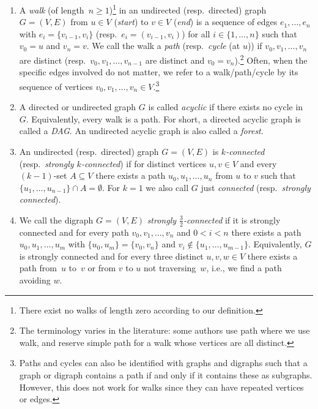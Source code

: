 \begin{enumerate}	
	\item A \emph{walk} (of length~$n \ge 1$)\footnote{There exist no walks of length zero according to our definition.}
	in an undirected (resp.~directed) graph $G = (V,E)$ from $u \in V$ (\emph{start}) to $v \in V$ (\emph{end}) is a sequence
	of edges $e_1, \ldots, e_n$
	with $e_i = \{ v_{i-1}, v_i\}$ (resp.~$e_i = (v_{i-1}, v_i)$) for all $i \in \{1,\ldots,n\}$
	such that $v_0 = u$ and $v_n = v$.
	We call the walk a \emph{path}		
	(resp.~\emph{cycle} (at $u$))
	if $v_0, v_1, \ldots, v_n$ are distinct (resp.~$v_0, v_1,\ldots, v_{n-1}$ are distinct and $v_0 = v_n$).\footnote{The 
		terminology varies in the literature: some authors use path where we use walk, and reserve simple path for a walk whose vertices are all distinct.}
	Often, when the specific edges involved do not matter, we refer to a walk/path/cycle by its sequence of vertices
	$v_0, v_1, \ldots, v_n \in V$.\footnote{Paths and cycles can also be identified
		with graphs and digraphs such that a graph or digraph
		contains a path if and only if it contains these as subgraphs.
		However, this does not work for walks since they can have repeated vertices
		or edges.}		
	
\item A directed or undirected graph $G$ is called \emph{acyclic}
if there exists no cycle in~$G$. Equivalently, every walk is a path.
For short, a directed acyclic graph is called a \emph{DAG}. An undirected acyclic graph
is also called a \emph{forest}.

 
\item An undirected (resp.~directed) graph $G = (V, E)$ is \emph{$k$-connected} (resp.~\emph{strongly $k$-connected})
if for distinct vertices $u,v \in V$ and every $(k-1)$-set $A \subseteq V$ there exists
a path $u_0, u_1, \ldots, u_n$ from $u$ to $v$
such that $\{u_1, \ldots, u_{n-1}\} \cap A = \emptyset$.
For $k = 1$ we also call $G$ just \emph{connected} (resp.~\emph{strongly connected}).
	
	\item We call the digraph $G = (V,E)$ \emph{strongly $\frac{3}{2}$-connected}
	if it is strongly connected and for every path $v_0, v_1, \ldots, v_n$
	and $0 < i < n$ there exists a path $u_0, u_1, \ldots, u_m$
	with $\{u_0, u_m \} = \{ v_0, v_n \}$
	and $v_i \notin \{u_1, \ldots, u_{m-1}\}$. Equivalently, $G$ is strongly connected and
	for every three distinct $u,v,w \in V$
	there exists a path from~$u$ to~$v$ or from $v$ to $u$ not traversing~$w$, i.e.,
	we find a path avoiding $w$.
	

\end{enumerate}

